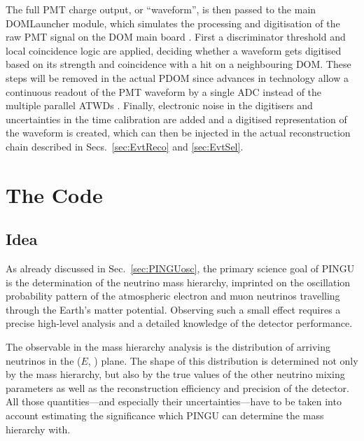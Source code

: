 The full PMT charge output, or ``waveform'', is then passed to the main
DOMLauncher module, which simulates the processing and digitisation of the raw
PMT signal on the DOM main board \cite{DOMLauncher}. First
a discriminator threshold and local coincidence logic are applied, deciding
whether a waveform gets digitised based on its strength and coincidence with a
hit on a neighbouring DOM. These steps will be removed in the actual PDOM since
advances in technology allow a continuous readout of the PMT waveform by a
single ADC instead of the multiple parallel ATWDs \cite{PDOM_Aachen}. Finally,
electronic noise in the digitisers and uncertainties in the time calibration are
added and a digitised representation of the waveform is created, which can then
be injected in the actual reconstruction chain described in
Secs.~\ref{sec:EvtReco} and \ref{sec:EvtSel}.

\section{The \papa Code}
\label{sec:papa}

\subsection{Idea}
\label{sec:sim_idea}

As already discussed in Sec.~\ref{sec:PINGUosc}, the primary science goal of
PINGU is the determination of the neutrino mass hierarchy, imprinted on the
oscillation probability pattern of the atmospheric electron and muon neutrinos
travelling through the Earth's matter potential. Observing such a small effect
requires a precise high-level analysis and a detailed knowledge of the detector 
performance. 

The observable in the mass hierarchy analysis is the distribution of arriving 
neutrinos in the ($E$, \coszen) plane. The shape of this distribution is 
determined not only by the mass hierarchy, but also by the true values of the 
other neutrino mixing parameters as well as the reconstruction efficiency and
precision of the detector. All those quantities---and especially their 
uncertainties---have to be taken into account estimating the significance 
which PINGU can determine the mass hierarchy with.

